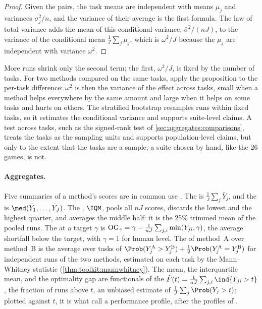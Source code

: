 \begin{refsection}
\begin{proof}
Given the pairs, the task means are independent with means $\mu_j$ and variances $\sigma_j^2/n$, and the variance of their average is the first formula. The law of total variance adds the mean of this conditional variance, $\bar\sigma^2/(nJ)$, to the variance of the conditional mean $\frac1J\sum_j\mu_j$, which is $\omega^2/J$ because the $\mu_j$ are independent with variance $\omega^2$.
\end{proof}

More runs shrink only the second term; the first, $\omega^2/J$, is fixed by the number of tasks. For two methods compared on the same tasks, apply the proposition to the per-task difference: $\omega^2$ is then the variance of the effect across tasks, small when a method helps everywhere by the same amount and large when it helps on some tasks and hurts on others. The stratified bootstrap resamples runs within fixed tasks, so it estimates the conditional variance and supports suite-level claims. A test across tasks, such as the signed-rank test of \cref{sec:aggregates:comparisons}, treats the tasks as the sampling units and supports population-level claims, but only to the extent that the tasks are a sample; a suite chosen by hand, like the 26 games, is not.

\paragraph{Aggregates.} Five summaries of a method's scores are in common use \parencite{AgarwalEtAl2021}. The  is $\frac1J\sum_j\bar Y_j$, and the  is $\med(\bar Y_1,\dots,\bar Y_J)$. The , $\IQM$, pools all $nJ$ scores, discards the lowest and the highest quarter, and averages the middle half: it is the 25\% trimmed mean of the pooled runs. The  at a target $\gamma$ is $\mathrm{OG}_\gamma=\gamma-\frac1{nJ}\sum_{j,i}\min(Y_{ji},\gamma)$, the average shortfall below the target, with $\gamma=1$ for human level. The  of method~A over method~B is the average over tasks of $\Prob(Y^{\mathrm A}_j>Y^{\mathrm B}_j)+\frac12\Prob(Y^{\mathrm A}_j=Y^{\mathrm B}_j)$ for independent runs of the two methods, estimated on each task by the Mann--Whitney statistic (\cref{thm:toolkit:mannwhitney}). The mean, the interquartile mean, and the optimality gap are functionals of the  $\hat F(t)=\frac1{nJ}\sum_{j,i}\ind\{Y_{ji}>t\}$, the fraction of runs above $t$, an unbiased estimate of $\frac1J\sum_j\Prob(Y_j>t)$; plotted against $t$, it is what \textcite{AgarwalEtAl2021} call a performance profile, after the profiles of \textcite{DolanMore2002}.


\end{refsection}
